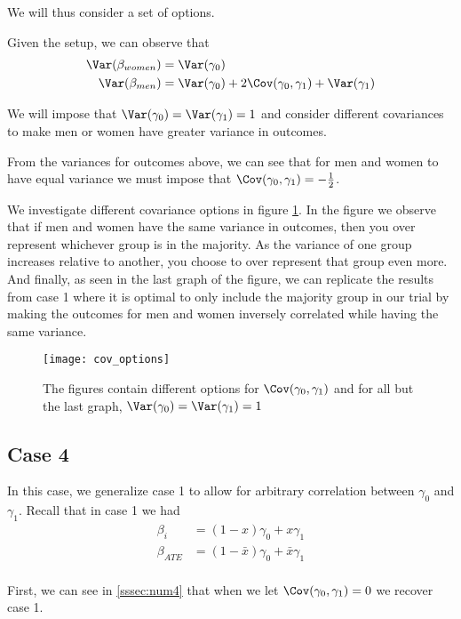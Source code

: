 We will thus consider a set of options.

Given the setup, we can observe that
\begin{align*}
	\Var(\beta_{women}) &= \Var(\gamma_0) \\
	\Var(\beta_{men}) &= \Var(\gamma_0) + 2\Cov(\gamma_0, \gamma_1) + \Var(\gamma_1) \\
\end{align*} 

We will impose that $\Var(\gamma_0) = \Var(\gamma_1) = 1$ and consider different covariances to make men or women have greater variance in outcomes.

From the variances for outcomes above, we can see that for men and women to have equal variance we must impose that $\Cov(\gamma_0, \gamma_1) = -\frac{1}{2}$.

We investigate different covariance options in figure \ref{fig:cov_options}. In the figure we observe that if men and women have the same variance in outcomes, then you over represent whichever group is in the majority. As the variance of one group increases relative to another, you choose to over represent that group even more.
And finally, as seen in the last graph of the figure, we can replicate the results from case 1 where it is optimal to only include the majority group in our trial by making the outcomes for men and women inversely correlated while having the same variance.

\begin{figure}[btp]
	\centering
	\texttt{[image: cov\_options]}
	\caption{The figures contain different options for $\Cov(\gamma_0, \gamma_1)$ and for all but the last graph, $\Var(\gamma_0) = \Var(\gamma_1) = 1$} 
	\label{fig:cov_options}
\end{figure}

\subsection*{Case 4}

In this case, we generalize case 1 to allow for arbitrary correlation between $\gamma_0$ and $\gamma_1$.
Recall that in case 1 we had
\begin{align*}
	\beta_i &=  (1-x)\gamma_0 + x \gamma_1 \\
	\beta_{ATE} &=  (1 - \bar{x})\gamma_0 + \bar{x} \gamma_1 \\
\end{align*}


First, we can see in \ref{sssec:num4} that when we let  $\Cov(\gamma_0, \gamma_1) = 0$ we recover case 1.

